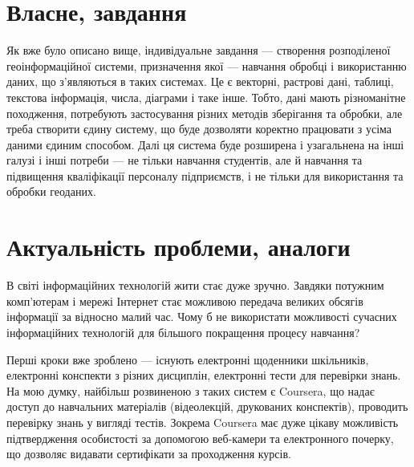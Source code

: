 \section{Власне, завдання}
Як вже було описано вище, індивідуальне завдання --- створення розподіленої
геоінформаційної системи, призначення якої --- навчання обробці і використанню
даних, що з’являються в таких системах.
Це є векторні, растрові дані, таблиці, текстова інформація, числа, діаграми
і таке інше.
Тобто, дані мають різноманітне походження, потребують застосування різних
методів зберігання та обробки, але треба створити єдину систему, що буде
дозволяти коректно працювати з усіма даними єдиним способом.
Далі ця система буде розширена і узагальнена на інші галузі і інші потреби
--- не тільки навчання студентів, але й навчання та підвищення кваліфікації
персоналу підприємств, і не тільки для використання та обробки геоданих.

\section{Актуальність проблеми, аналоги}
В світі інформаційних технологій жити стає дуже зручно.
Завдяки потужним комп’ютерам і мережі Інтернет стає можливою передача великих
обсягів інформації за відносно малий час.
Чому б не використати можливості сучасних інформаційних технологій для більшого
покращення процесу навчання?

Перші кроки вже зроблено --- існують електронні щоденники шкільників,
електронні конспекти з різних дисциплін, електронні тести для перевірки знань.
На мою думку, найбільш розвиненою з таких систем є Coursera, що надає доступ
до навчальних матеріалів (відеолекцій, друкованих конспектів), проводить
перевірку знань у вигляді тестів. Зокрема Coursera має дуже цікаву можливість
підтвердження особистості за допомогою веб-камери та електронного почерку, що
дозволяє видавати сертифікати за проходження курсів.
